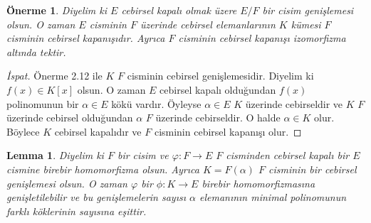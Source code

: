 \documentclass[draft]{article}
\newtheorem{lem}[thm]{Lemma}
\newtheorem{prop}[thm]{Önerme}
\theoremstyle{definition}
\theoremstyle{remark}
\begin{document}
            \begin{prop}
                Diyelim ki $E$ cebirsel kapalı olmak üzere $E/F$ bir cisim genişlemesi olsun. O zaman $E$ cisminin $F$ üzerinde cebirsel elemanlarının $K$ kümesi $F$ cisminin cebirsel kapanışıdır. Ayrıca $F$ cisminin cebirsel kapanışı izomorfizma altında tektir.
            \end{prop}
            
            \begin{proof}[İspat]
                Önerme 2.12 ile $K$ $F$ cisminin cebirsel genişlemesidir. Diyelim ki $f(x) \in K[x]$ olsun. O zaman $E$ cebirsel kapalı olduğundan $f(x)$ polinomunun bir $\alpha \in E$ kökü vardır. Öyleyse $\alpha \in E$ $K$ üzerinde cebirseldir ve $K$ $F$ üzerinde cebirsel olduğundan $\alpha$ $F$ üzerinde cebirseldir. O halde $\alpha \in K$ olur. Böylece $K$ cebirsel kapalıdır ve $F$ cisminin cebirsel kapanışı olur.
            \end{proof}
            
            \begin{lem}
                Diyelim ki $F$ bir cisim ve $\varphi: F \to E$ $F$ cisminden cebirsel kapalı bir $E$ cismine birebir homomorfizma olsun. Ayrıca $K = F(\alpha)$ $F$ cisminin bir cebirsel genişlemesi olsun. O zaman $\varphi$ bir $\phi: K \to E$ birebir homomorfizmasına genişletilebilir ve bu genişlemelerin sayısı $\alpha$ elemanının minimal polinomunun farklı köklerinin sayısına eşittir.
            \end{lem}
            
\end{document}
